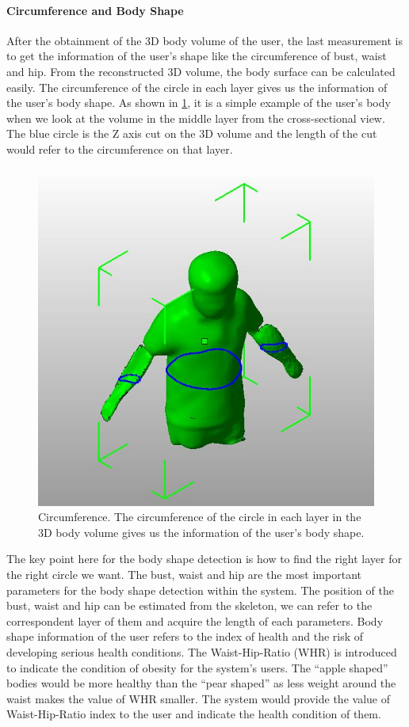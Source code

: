 \paragraph{Circumference and Body Shape}
After the obtainment of the 3D body volume of the user, the last measurement is to get the information of the user's shape like the circumference of bust, waist and hip. %
From the reconstructed 3D volume, the body surface can be calculated easily. The circumference of the circle in each layer gives us the information of the user's body shape. As shown in \figurename{\ref{fig:3-PRMM:Circumference}}, it is a simple example of the user's body when we look at the volume in the middle layer from the cross-sectional view. The blue circle is the Z axis cut on the 3D volume and the length of the cut would refer to the circumference on that layer.
\begin{figure}
	\centering
	\includegraphics[width=0.5\linewidth]{figures/3-PRMM/Circumference}
	\caption{Circumference. The circumference of the circle in each layer in the 3D body volume gives us the information of the user's body shape.}
	\label{fig:3-PRMM:Circumference}
\end{figure}
The key point here for the body shape detection is how to find the right layer for the right circle we want. The bust, waist and hip are the most important parameters for the body shape detection within the system. 
The position of the bust, waist and hip can be estimated from the skeleton, we can refer to the correspondent layer of them and acquire the length of each parameters.
Body shape information of the user refers to the index of health and the risk of developing serious health conditions. The Waist-Hip-Ratio (WHR)\cite{Consultation2008} is introduced to indicate the condition of obesity for the system's users. The ``apple shaped'' bodies would be more healthy than the ``pear shaped'' as less weight around the waist makes the value of WHR smaller.
The system would provide the value of Waist-Hip-Ratio index to the user and indicate the health condition of them.

